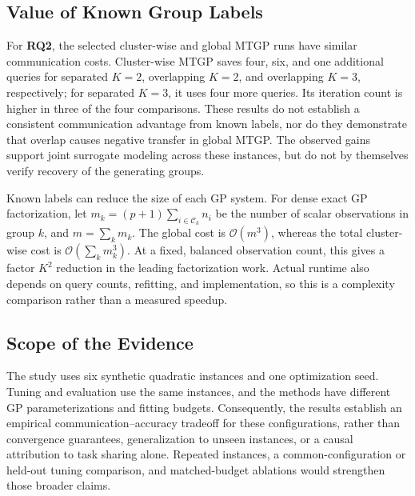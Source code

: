\subsection{Value of Known Group Labels}
For \textbf{RQ2}, the selected cluster-wise and global MTGP runs have similar communication costs. Cluster-wise MTGP saves four, six, and one additional queries for separated $K=2$, overlapping $K=2$, and overlapping $K=3$, respectively; for separated $K=3$, it uses four more queries. Its iteration count is higher in three of the four comparisons. These results do not establish a consistent communication advantage from known labels, nor do they demonstrate that overlap causes negative transfer in global MTGP. The observed gains support joint surrogate modeling across these instances, but do not by themselves verify recovery of the generating groups.

Known labels can reduce the size of each GP system. For dense exact GP factorization, let $m_k=(p+1)\sum_{i\in\mathcal C_k}n_i$ be the number of scalar observations in group $k$, and $m=\sum_km_k$. The global cost is $\mathcal O(m^3)$, whereas the total cluster-wise cost is $\mathcal O(\sum_km_k^3)$. At a fixed, balanced observation count, this gives a factor $K^2$ reduction in the leading factorization work. Actual runtime also depends on query counts, refitting, and implementation, so this is a complexity comparison rather than a measured speedup.

\subsection{Scope of the Evidence}
The study uses six synthetic quadratic instances and one optimization seed. Tuning and evaluation use the same instances, and the methods have different GP parameterizations and fitting budgets. Consequently, the results establish an empirical communication--accuracy tradeoff for these configurations, rather than convergence guarantees, generalization to unseen instances, or a causal attribution to task sharing alone. Repeated instances, a common-configuration or held-out tuning comparison, and matched-budget ablations would strengthen those broader claims.
